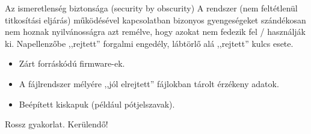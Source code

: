 \documentclass[12 pt]{beamer}
\begin{document}
\begin{frame}{Az ismeretlenség biztonsága (security by obscurity)}
  A rendszer (nem feltétlenül titkosítási eljárás) működésével kapcsolatban bizonyos gyengeségeket szándékosan nem hoznak nyilvánosságra azt remélve, hogy azokat nem fedezik fel / használják ki. Napellenzőbe ,,rejtett'' forgalmi engedély, lábtörlő alá ,,rejtett'' kulcs esete.

  \begin{itemize}
    \item{Zárt forráskódú firmware-ek.}
    \item{A fájlrendszer mélyére ,,jól elrejtett'' fájlokban tárolt érzékeny adatok.}
    \item{Beépített kiskapuk (például pótjelszavak).}
  \end{itemize}

  \begin{alertblock}{}
    \centering Rossz gyakorlat. Kerülendő!
  \end{alertblock}

\end{frame}

\end{document}
